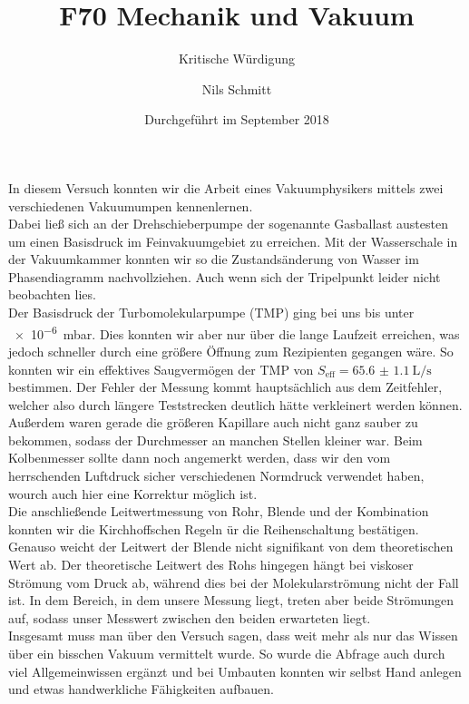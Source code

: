 \documentclass[12pt,
				 a4paper,
				numbers=endperiod
				 ]{scrartcl}
\title{F70 Mechanik und Vakuum}
\subtitle{Kritische Würdigung}
\author{Nils Schmitt}
\date{Durchgeführt im September 2018}
\begin{document}
\maketitle
In diesem Versuch konnten wir die Arbeit eines Vakuumphysikers mittels zwei verschiedenen Vakuumumpen kennenlernen.\\

Dabei ließ sich an der Drehschieberpumpe der sogenannte Gasballast austesten um einen Basisdruck im Feinvakuumgebiet zu erreichen.
Mit der Wasserschale in der Vakuumkammer konnten wir so die Zustandsänderung von Wasser im Phasendiagramm nachvollziehen.
Auch wenn sich der Tripelpunkt leider nicht beobachten lies.\\
Der Basisdruck der Turbomolekularpumpe (TMP) ging bei uns bis unter \SI{e-6}{\milli\bar}.
Dies konnten wir aber nur über die lange Laufzeit erreichen, was jedoch schneller durch eine größere Öffnung zum Rezipienten gegangen wäre.
So konnten wir ein effektives Saugvermögen der TMP von $S_{\text{eff}}=\SI{65.6(11)}{\liter\per\second}$ bestimmen.
Der Fehler der Messung kommt hauptsächlich aus dem Zeitfehler, welcher also durch längere Teststrecken deutlich hätte verkleinert werden können.
Außerdem waren gerade die größeren Kapillare auch nicht ganz sauber zu bekommen, sodass der Durchmesser an manchen Stellen kleiner war.
Beim Kolbenmesser sollte dann noch angemerkt werden, dass wir den vom herrschenden Luftdruck sicher verschiedenen Normdruck verwendet haben, wourch auch hier eine Korrektur möglich ist.\\

Die anschließende Leitwertmessung von Rohr, Blende und der Kombination konnten wir die Kirchhoffschen Regeln ür die Reihenschaltung bestätigen.
Genauso weicht der Leitwert der Blende nicht signifikant von dem theoretischen Wert ab.
Der theoretische Leitwert des Rohs hingegen hängt bei viskoser Strömung vom Druck ab, während dies bei der Molekularströmung nicht der Fall ist.
In dem Bereich, in dem unsere Messung liegt, treten aber beide Strömungen auf, sodass unser Messwert zwischen den beiden erwarteten liegt.\\

Insgesamt muss man über den Versuch sagen, dass weit mehr als nur das Wissen über ein bisschen Vakuum vermittelt wurde.
So wurde die Abfrage auch durch viel Allgemeinwissen ergänzt und bei Umbauten konnten wir selbst Hand anlegen und etwas handwerkliche Fähigkeiten aufbauen. 
\end{document}
